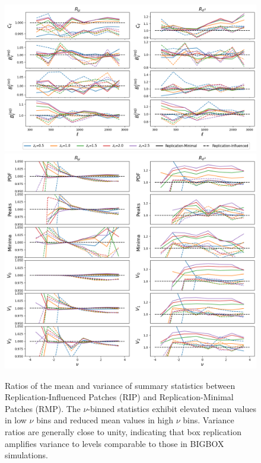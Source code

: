 \begin{figure}[p] 
    \centering 
    \includegraphics[width=\textwidth]{figures/results/BR_ratio_ell.png} 
    \includegraphics[width=\textwidth]{figures/results/BR_ratio_nu.png} 
    \caption[BIGBOX/TILED Ratios of the mean and variance of summary statistics for the RIPs and the RMPs]{Ratios of the mean and variance of summary statistics between Replication-Influenced Patches (RIP) and Replication-Minimal Patches (RMP). The $\nu$-binned statistics exhibit elevated mean values in low $\nu$ bins and reduced mean values in high $\nu$ bins. Variance ratios are generally close to unity, indicating that box replication amplifies variance to levels comparable to those in BIGBOX simulations.} \label{fig:boxreplication_main} 
\end{figure}

